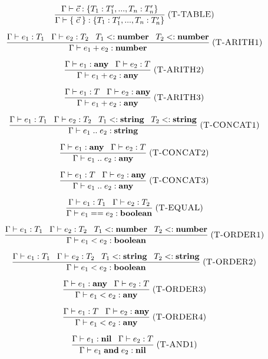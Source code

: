 \documentclass[12pt]{article}
\newcommand{\Any}{\mathbf{any}}
\newcommand{\Nil}{\mathbf{nil}}
\newcommand{\Boolean}{\mathbf{boolean}}
\newcommand{\Number}{\mathbf{number}}
\newcommand{\String}{\mathbf{string}}
\newcommand{\kw}[1]{\mathbf{#1}}
\newcommand{\mylabel}[1]{\; (\textsc{#1})}
\newcommand{\subtype}{<:}
\newcommand{\env}{\Gamma}
\begin{document}
\[
\frac{\env \vdash \vec{c} : \{ T_{1}:T_{1}', ..., T_{n}:T_{n}' \}}
     {\env \vdash \{ \; \vec{c} \; \} : \{ T_{1}:T_{1}', ..., T_{n}:T_{n}' \}}
\mylabel{T-TABLE}
\]

\[
\frac{\env \vdash e_{1}:T_{1} \;\;\;
      \env \vdash e_{2}:T_{2} \;\;\;
      T_{1} \subtype \Number \;\;\;
      T_{2} \subtype \Number}
     {\env \vdash e_{1} + e_{2} : \Number}
\mylabel{T-ARITH1}
\]

\[
\frac{\env \vdash e_{1}:\Any \;\;\;
      \env \vdash e_{2}:T}
     {\env \vdash e_{1} + e_{2} : \Any}
\mylabel{T-ARITH2}
\]

\[
\frac{\env \vdash e_{1}:T \;\;\;
      \env \vdash e_{2}:\Any}
     {\env \vdash e_{1} + e_{2} : \Any}
\mylabel{T-ARITH3}
\]

\[
\frac{\env \vdash e_{1}:T_{1} \;\;\;
      \env \vdash e_{2}:T_{2} \;\;\;
      T_{1} \subtype \String \;\;\;
      T_{2} \subtype \String}
     {\env \vdash e_{1} \; {..} \; e_{2} : \String}
\mylabel{T-CONCAT1}
\]

\[
\frac{\env \vdash e_{1}:\Any \;\;\;
      \env \vdash e_{2}:T}
     {\env \vdash e_{1} \; {..} \; e_{2} : \Any}
\mylabel{T-CONCAT2}
\]

\[
\frac{\env \vdash e_{1}:T \;\;\;
      \env \vdash e_{2}:\Any}
     {\env \vdash e_{1} \; {..} \; e_{2} : \Any}
\mylabel{T-CONCAT3}
\]

\[
\frac{\env \vdash e_{1}:T_{1} \;\;\;
      \env \vdash e_{2}:T_{2}}
     {\env \vdash e_{1} == e_{2} : \Boolean}
\mylabel{T-EQUAL}
\]

\[
\frac{\env \vdash e_{1}:T_{1} \;\;\;
      \env \vdash e_{2}:T_{2} \;\;\;
      T_{1} \subtype \Number \;\;\;
      T_{2} \subtype \Number}
     {\env \vdash e_{1} < e_{2} : \Boolean}
\mylabel{T-ORDER1}
\]

\[
\frac{\env \vdash e_{1}:T_{1} \;\;\;
      \env \vdash e_{2}:T_{2} \;\;\;
      T_{1} \subtype \String \;\;\;
      T_{2} \subtype \String}
     {\env \vdash e_{1} < e_{2} : \Boolean}
\mylabel{T-ORDER2}
\]

\[
\frac{\env \vdash e_{1}:\Any \;\;\;
      \env \vdash e_{2}:T}
     {\env \vdash e_{1} < e_{2} : \Any}
\mylabel{T-ORDER3}
\]

\[
\frac{\env \vdash e_{1}:T \;\;\;
      \env \vdash e_{2}:\Any}
     {\env \vdash e_{1} < e_{2} : \Any}
\mylabel{T-ORDER4}
\]

\[
\frac{\env \vdash e_{1}:\Nil \;\;\;
      \env \vdash e_{2}:T}
     {\env \vdash e_{1} \; \kw{and} \; e_{2} : \Nil}
\mylabel{T-AND1}
\]
\end{document}
